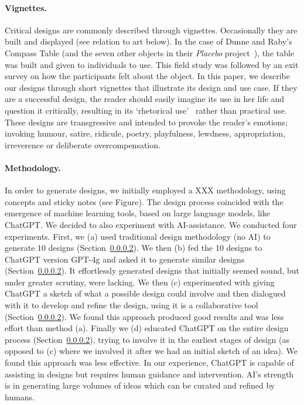 \paragraph{Vignettes.} Critical designs are commonly described through vignettes. Occasionally they are built and displayed (see relation to art below). In the case of Dunne and Raby's Compass Table (and the seven other objects in their \textit{Placebo} project~\cite{DuRa01}), the table was built and given to individuals to use. This field study was followed by an exit survey on how the participants felt about the object. In this paper, we describe our designs through short vignettes that illustrate its design and use case. If they are a successful design, the reader should easily imagine its use in her life and question it critically, resulting in its `rhetorical use'~\cite{Mal17} rather than practical use. These designs are transgressive and intended to provoke the reader's emotions; invoking humour, satire, ridicule, poetry, playfulness, lewdness, appropriation, irreverence or deliberate overcompensation.

\paragraph{Methodology.} In order to generate designs, we initially employed a XXX methodology, using concepts and sticky notes (see Figure). The design process coincided with the emergence of machine learning tools, based on large language models, like ChatGPT. We decided to also experiment with AI-assistance. We conducted four experiments. First, we (a) used traditional design methodology (no AI) to generate 10 designs (Section~\ref{}). We then (b) fed the 10 designs to ChatGPT version GPT-4g and asked it to generate similar designs (Section~\ref{}). It effortlessly generated designs that initially seemed sound, but under greater scrutiny, were lacking. We then (c) experimented with giving ChatGPT a sketch of what a possible design could involve and then dialogued with it to develop and refine the design, using it is a collaborative tool (Section~\ref{}). We found this approach produced good results and was less effort than method (a). Finally we (d) educated ChatGPT on the entire design process (Section~\ref{}), trying to involve it in the earliest stages of design (as opposed to (c) where we involved it after we had an initial sketch of an idea). We found this approach was less effective. In our experience, ChatGPT is capable of assisting in designs but requires human guidance and intervention. AI's strength is in generating large volumes of ideas which can be curated and refined by humans.

